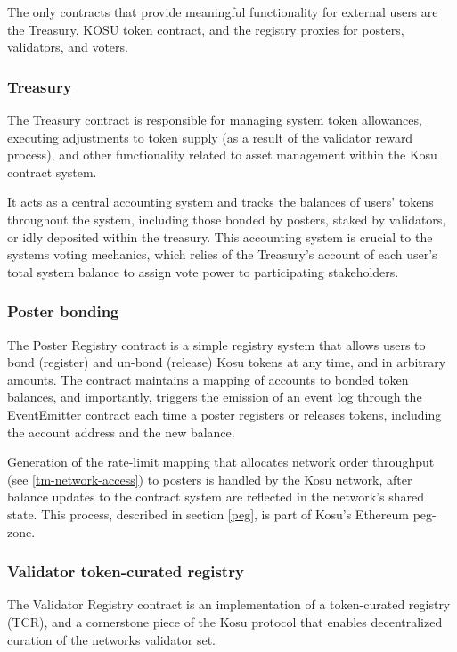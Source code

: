 \documentclass[10pt]{article}
\begin{document}
The only contracts that provide meaningful functionality for external users are the Treasury, KOSU token contract, and the registry proxies for posters, validators, and voters.

\subsubsection{Treasury}\label{ethereum-contract-system-treasury}
The Treasury contract is responsible for managing system token allowances, executing adjustments to token supply (as a result of the validator reward process), and other functionality related to asset management within the Kosu contract system.
\medskip

It acts as a central accounting system and tracks the balances of users' tokens throughout the system, including those bonded by posters, staked by validators, or idly deposited within the treasury. This accounting system is crucial to the systems voting mechanics, which relies of the Treasury’s account of each user’s total system balance to assign vote power to participating stakeholders. 
\subsubsection{Poster bonding}\label{ethereum-contract-system-poster-bonding}
The Poster Registry contract is a simple registry system that allows users to bond (register) and un-bond (release) Kosu tokens at any time, and in arbitrary amounts. The contract maintains a mapping of accounts to bonded token balances, and importantly, triggers the emission of an event log through the EventEmitter contract each time a poster registers or releases tokens, including the account address and the new balance.
\medskip

Generation of the rate-limit mapping that allocates network order throughput (see \ref{tm-network-access}) to posters is handled by the Kosu network, after balance updates to the contract system are reflected in the network's shared state. This process, described in section \ref{peg}, is part of Kosu’s Ethereum peg-zone.
\subsubsection{Validator token-curated registry}\label{ethereum-contract-system-tcr}
The Validator Registry contract is an implementation of a token-curated registry (TCR), and a cornerstone piece of the Kosu protocol that enables decentralized curation of the networks validator set.
\end{document}
